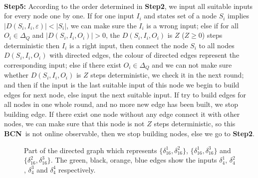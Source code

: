 \documentclass[letterpaper, 10 pt, conference]{ieeeconf}  %
\def \BCN {{\bf BCN}}
\begin{document}
\\  
{\bf Step5:} According to the order determined in {\bf Step2}, we input all suitable inputs for every node one by one. If for one input $I_i$ and states set of a node $S_i$ implies $|D\left(S_i,I_i,\varepsilon\right)|<|S_i|$, we can make sure the $I_i$ is a wrong input; else if for all $O_i \in \Delta_Q$ and $|D\left(S_i,I_i,O_i\right)|>0$, the $D\left(S_i,I_i,O_i\right)$ is $Z$ ($Z\ge 0$) steps deterministic then $I_i$ is a right input, then connect the node $S_i$ to all nodes $D\left(S_i,I_i,O_i\right)$ with directed edges, the colour of directed edges represent the corresponding input; else if there exist $O_i \in \Delta_Q$ and we can not make sure whether $D\left(S_i,I_i,O_i\right)$ is $Z$ steps deterministic, we check it in the next round; and then if the input is the last suitable input of this node we begin to build edges for next node,  else input the next suitable input. If try to build edges for all nodes in one whole round, and no more new edge has been built, we stop building edge. If there exist one node without any edge connect it with other nodes, we can make sure that this node is not $Z$ steps deterministic, so this \BCN\ is not online observable, then we stop building nodes, else we go to {\bf Step2}.

\begin{figure}[thpb]
      \centering
      
      \caption{Part of the directed graph which represents $\{\delta_{16}^1,\delta_{16}^2\}$, $\{\delta_{16}^1,\delta_{16}^3\}$ and $\{\delta_{16}^2,\delta_{16}^3\}$. The green, black, orange, blue edges show the inputs $\delta_4^1$, $\delta_4^2$, $\delta_4^3$ and $\delta_4^4$ respectively.}
      \label{fig:4}
   \end{figure}
\end{document}
